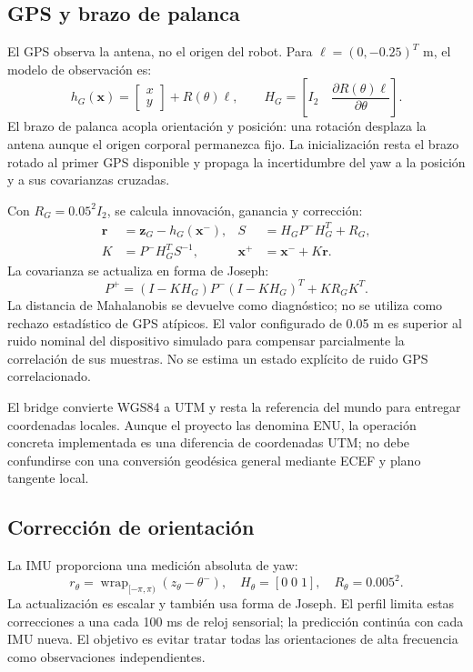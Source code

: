 \documentclass[11pt,a4paper]{article}
\newcommand{\wrap}{\operatorname{wrap}_{[-\pi,\pi)}}
\begin{document}
\subsection{GPS y brazo de palanca}
El GPS observa la antena, no el origen del robot. Para
$\bm{\ell}=(0,-0.25)^T$ m, el modelo de observación es:
\begin{equation}
 h_G(\bm{x})=\begin{bmatrix}x\\y\end{bmatrix}+R(\theta)\bm{\ell},
 \qquad H_G=\left[I_2\quad \frac{\partial R(\theta)\bm{\ell}}{\partial\theta}\right].
\end{equation}
El brazo de palanca acopla orientación y posición: una rotación desplaza la antena
aunque el origen corporal permanezca fijo. La inicialización resta el brazo rotado
al primer GPS disponible y propaga la incertidumbre del yaw a la posición y a sus
covarianzas cruzadas.~\cite{ekf}

Con $R_G=0.05^2I_2$, se calcula innovación, ganancia y corrección:
\begin{align}
 \bm{r}&=\bm{z}_G-h_G(\bm{x}^-),&S&=H_GP^-H_G^T+R_G,\\
 K&=P^-H_G^TS^{-1},&\bm{x}^+&=\bm{x}^-+K\bm{r}.
\end{align}
La covarianza se actualiza en forma de Joseph:
\begin{equation}
 P^+=(I-KH_G)P^-(I-KH_G)^T+KR_GK^T.
\end{equation}
La distancia de Mahalanobis se devuelve como diagnóstico; no se utiliza como
rechazo estadístico de GPS atípicos. El valor configurado de 0.05 m es superior al
ruido nominal del dispositivo simulado para compensar parcialmente la correlación
de sus muestras. No se estima un estado explícito de ruido GPS correlacionado.
\cite{ekf,openconfig}

El bridge convierte WGS84 a UTM y resta la referencia del mundo para entregar
coordenadas locales. Aunque el proyecto las denomina ENU, la operación concreta
implementada es una diferencia de coordenadas UTM; no debe confundirse con una
conversión geodésica general mediante ECEF y plano tangente local.~\cite{bridgegps}

\subsection{Corrección de orientación}
La IMU proporciona una medición absoluta de yaw:
\begin{equation}
 r_\theta=\wrap(z_\theta-\theta^-),\quad
 H_\theta=[0\;0\;1],\quad R_\theta=0.005^2.
\end{equation}
La actualización es escalar y también usa forma de Joseph. El perfil limita estas
correcciones a una cada 100 ms de reloj sensorial; la predicción continúa con cada
IMU nueva. El objetivo es evitar tratar todas las orientaciones de alta frecuencia
como observaciones independientes.~\cite{ekf,openworker,openconfig}
\end{document}
